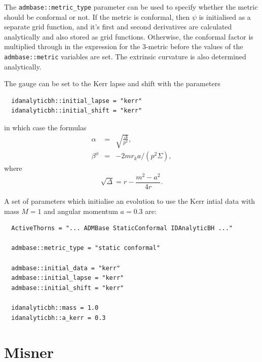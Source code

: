\documentclass{article}
\begin{document}
The \texttt{admbase::metric\_type} parameter can be used to specify
whether the metric should be conformal or not. If the metric is
conformal, then $\psi$ is initialised as a separate grid function, and
it's first and second derivatives are calculated analytically and also
stored as grid functions. Otherwise, the conformal factor is
multiplied through in the expression for the 3-metric before the
values of the \texttt{admbase::metric} variables are set. The
extrinsic curvature is also determined analytically.

The gauge can be set to the Kerr lapse and shift with the parameters
\begin{verbatim}
  idanalyticbh::initial_lapse = "kerr"
  idanalyticbh::initial_shift = "kerr"
\end{verbatim}
in which case the formulas
\begin{eqnarray}
  \alpha & = &\sqrt{\frac{\Delta}{p^2}}, \\
  \beta^\phi & = & -2 m r_k a / (p^2 \Sigma),
\end{eqnarray}
where
\begin{equation}
  \sqrt{\Delta} = r - \frac{m^2 - a^2}{4r}.
\end{equation}

A set of parameters which initialise an evolution to use the Kerr
intial data with mass $M=1$ and angular momentum $a=0.3$ are:
\begin{verbatim}
  ActiveThorns = "... ADMBase StaticConformal IDAnalyticBH ..."

  admbase::metric_type = "static conformal"

  admbase::initial_data = "kerr"
  admbase::initial_lapse = "kerr"
  admbase::initial_shift = "kerr"

  idanalyticbh::mass = 1.0
  idanalyticbh::a_kerr = 0.3
\end{verbatim}

\section{Misner}
\end{document}
